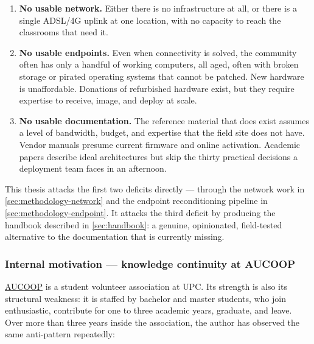 \begin{enumerate}
\def\labelenumi{\arabic{enumi}.}
\tightlist
\item
  \textbf{No usable network.} Either there is no infrastructure at all,
  or there is a single ADSL/4G uplink at one location, with no capacity
  to reach the classrooms that need it.
\item
  \textbf{No usable endpoints.} Even when connectivity is solved, the
  community often has only a handful of working computers, all aged,
  often with broken storage or pirated operating systems that cannot be
  patched. New hardware is unaffordable. Donations of refurbished
  hardware exist, but they require expertise to receive, image, and
  deploy at scale.
\item
  \textbf{No usable documentation.} The reference material that does
  exist assumes a level of bandwidth, budget, and expertise that the
  field site does not have. Vendor manuals presume current firmware and
  online activation. Academic papers describe ideal architectures but
  skip the thirty practical decisions a deployment team faces in an
  afternoon.
\end{enumerate}

This thesis attacks the first two deficits directly --- through the
network work in \autoref{sec:methodology-network} and the endpoint
reconditioning pipeline in \autoref{sec:methodology-endpoint}. It
attacks the third deficit by producing the handbook described in
\autoref{sec:handbook}: a genuine, opinionated, field-tested alternative
to the documentation that is currently missing.

\hypertarget{internal-motivation-knowledge-continuity-at-aucoop}{%
\subsubsection{Internal motivation --- knowledge continuity at
AUCOOP}\label{internal-motivation-knowledge-continuity-at-aucoop}}

\href{https://aucoop.upc.edu}{AUCOOP} is a student volunteer association
at UPC. Its strength is also its structural weakness: it is staffed by
bachelor and master students, who join enthusiastic, contribute for one
to three academic years, graduate, and leave. Over more than three years
inside the association, the author has observed the same anti-pattern
repeatedly:

